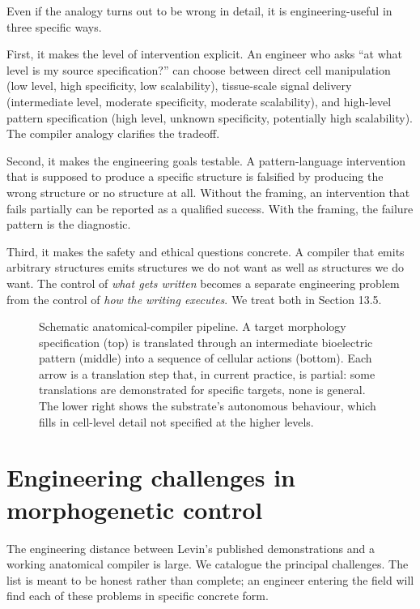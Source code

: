 Even if the analogy turns out to be wrong in detail, it is
engineering-useful in three specific ways.

First, it makes the level of intervention explicit. An engineer who
asks ``at what level is my source specification?'' can choose between
direct cell manipulation (low level, high specificity, low
scalability), tissue-scale signal delivery (intermediate level,
moderate specificity, moderate scalability), and high-level pattern
specification (high level, unknown specificity, potentially high
scalability). The compiler analogy clarifies the tradeoff.

Second, it makes the engineering goals testable. A pattern-language
intervention that is supposed to produce a specific structure is
falsified by producing the wrong structure or no structure at all.
Without the framing, an intervention that fails partially can be
reported as a qualified success. With the framing, the failure pattern
is the diagnostic.

Third, it makes the safety and ethical questions concrete. A compiler
that emits arbitrary structures emits structures we do not want as
well as structures we do want. The control of \textit{what gets
written} becomes a separate engineering problem from the control of
\textit{how the writing executes}. We treat both in Section 13.5.

\begin{figure}[ht]
  \centering
  
  \caption{Schematic anatomical-compiler pipeline. A target morphology
  specification (top) is translated through an intermediate bioelectric
  pattern (middle) into a sequence of cellular actions (bottom). Each
  arrow is a translation step that, in current practice, is partial:
  some translations are demonstrated for specific targets, none is
  general. The lower right shows the substrate's autonomous behaviour,
  which fills in cell-level detail not specified at the higher levels.}
  \label{fig:vol06ch13-compiler-pipeline}
\end{figure}

\section{Engineering challenges in morphogenetic control}

The engineering distance between Levin's published demonstrations and a
working anatomical compiler is large. We catalogue the principal
challenges. The list is meant to be honest rather than complete; an
engineer entering the field will find each of these problems in
specific concrete form.

